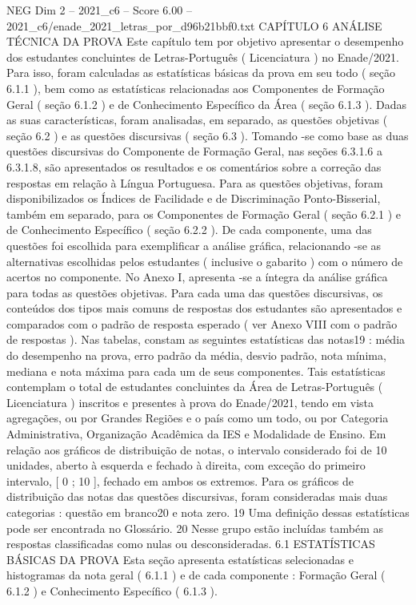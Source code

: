 \begin{textsample}{NEG Dim 2 – 2021\_c6 – Score 6.00 – 2021\_c6/enade\_2021\_letras\_por\_d96b21bbf0.txt}  \label{ex:f2_neg_264}
CAPÍTULO 6 ANÁLISE TÉCNICA DA PROVA Este capítulo tem por objetivo apresentar o desempenho dos estudantes concluintes de Letras-Português ( Licenciatura ) no Enade/2021.
Para isso, foram calculadas as estatísticas básicas da prova em seu todo ( seção 6.1.1 ), bem como as estatísticas relacionadas aos Componentes de Formação Geral ( seção 6.1.2 ) e de Conhecimento Específico da Área ( seção 6.1.3 ).
Dadas as suas características, foram analisadas, em separado, as questões objetivas ( seção 6.2 ) e as questões discursivas ( seção 6.3 ).
Tomando -se como base as duas questões discursivas do Componente de Formação Geral, nas seções 6.3.1.6 a 6.3.1.8, são apresentados os resultados e os comentários sobre a correção das respostas em relação à Língua Portuguesa.
Para as questões objetivas, foram disponibilizados os Índices de Facilidade e de Discriminação Ponto-Bisserial, também em separado, para os Componentes de Formação Geral ( seção 6.2.1 ) e de Conhecimento Específico ( seção 6.2.2 ).
De cada componente, uma das questões foi escolhida para exemplificar a análise gráfica, relacionando -se as alternativas escolhidas pelos estudantes ( inclusive o gabarito ) com o número de acertos no componente.
No Anexo I, apresenta -se a íntegra da análise gráfica para todas as questões objetivas.
Para cada uma das questões discursivas, os conteúdos dos tipos mais comuns de respostas dos estudantes são apresentados e comparados com o padrão de resposta esperado ( ver Anexo VIII com o padrão de respostas ).
Nas tabelas, constam as seguintes estatísticas das notas19 : média do desempenho na prova, erro padrão da média, desvio padrão, nota mínima, mediana e nota máxima para cada um de seus componentes.
Tais estatísticas contemplam o total de estudantes concluintes da Área de Letras-Português ( Licenciatura ) inscritos e presentes à prova do Enade/2021, tendo em vista agregações, ou por Grandes Regiões e o país como um todo, ou por Categoria Administrativa, Organização Acadêmica da IES e Modalidade de Ensino.
Em relação aos gráficos de distribuição de notas, o intervalo considerado foi de 10 unidades, aberto à esquerda e fechado à direita, com exceção do primeiro intervalo, [ 0 ; 10 ], fechado em ambos os extremos.
Para os gráficos de distribuição das notas das questões discursivas, foram consideradas mais duas categorias : questão em branco20 e nota zero. 19 Uma definição dessas estatísticas pode ser encontrada no Glossário. 20 Nesse grupo estão incluídas também as respostas classificadas como nulas ou desconsideradas. 6.1 ESTATÍSTICAS BÁSICAS DA PROVA Esta seção apresenta estatísticas selecionadas e histogramas da nota geral ( 6.1.1 ) e de cada componente : Formação Geral ( 6.1.2 ) e Conhecimento Específico ( 6.1.3 ).

\end{textsample}

